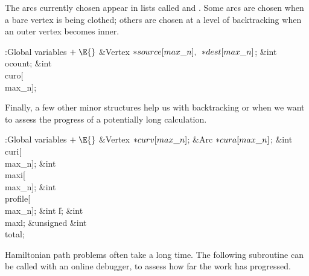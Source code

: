The arcs currently chosen appear in lists called  and .
Some arcs are chosen when a bare vertex is being clothed; others are
chosen at a level of backtracking when an outer vertex becomes inner.

\Y\B\4:Global variables\X${}\mathrel+\E{}$\6
\&{Vertex} ${}{*}\\{source}[\\{max\_n}],{}$ ${}{*}\\{dest}[\\{max\_n}]{}$;\6
\&{int} \\{ocount};\6
\&{int} \\{curo}[\\{max\_n}];\par
\fi

Finally, a few other minor structures help us with
backtracking or
when we want to assess the progress of a potentially long calculation.

\Y\B\4:Global variables\X${}\mathrel+\E{}$\6
\&{Vertex} ${}{*}\\{curv}[\\{max\_n}]{}$;\6
\&{Arc} ${}{*}\\{cura}[\\{max\_n}]{}$;\6
\&{int} \\{curi}[\\{max\_n}];\6
\&{int} \\{maxi}[\\{max\_n}];\6
\&{int} \\{profile}[\\{max\_n}];\6
\&{int} \|l;\6
\&{int} \\{maxl};\6
\&{unsigned} \&{int} \\{total};\par
\fi

Hamiltonian path problems often take a long time. The
following
subroutine can be called with an online debugger, to assess how
far the work has progressed.


